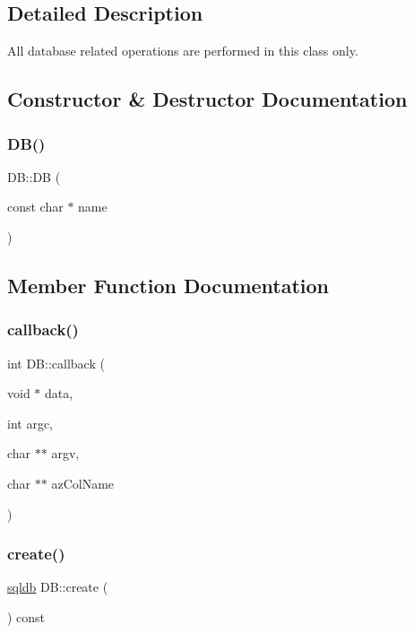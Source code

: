 \subsection{Detailed Description}
All database related operations are performed in this class only. 

\subsection{Constructor \& Destructor Documentation}
\mbox{\label{classDB_a1a7f3eafecf0e5834f03026c7f42e7ad}} 
\subsubsection{\texorpdfstring{D\+B()}{DB()}}
{\footnotesize\ttfamily D\+B\+::\+DB (\begin{DoxyParamCaption}\item[{const char $\ast$}]{name }\end{DoxyParamCaption})}



\subsection{Member Function Documentation}
\mbox{\label{classDB_ac0dbe2bbb16c4519de0cc7754269abed}} 
\subsubsection{\texorpdfstring{callback()}{callback()}}
{\footnotesize\ttfamily int D\+B\+::callback (\begin{DoxyParamCaption}\item[{void $\ast$}]{data,  }\item[{int}]{argc,  }\item[{char $\ast$$\ast$}]{argv,  }\item[{char $\ast$$\ast$}]{az\+Col\+Name }\end{DoxyParamCaption})\hspace{0.3cm}{\ttfamily [static]}}

\mbox{\label{classDB_a669630d5015f0a02c649484feb228f57}} 
\subsubsection{\texorpdfstring{create()}{create()}}
{\footnotesize\ttfamily \mbox{\hyperlink{db_8h_a8c50929ef9b94683ef6653b885e5b9ed}{sqldb}} D\+B\+::create (\begin{DoxyParamCaption}{ }\end{DoxyParamCaption}) const}

